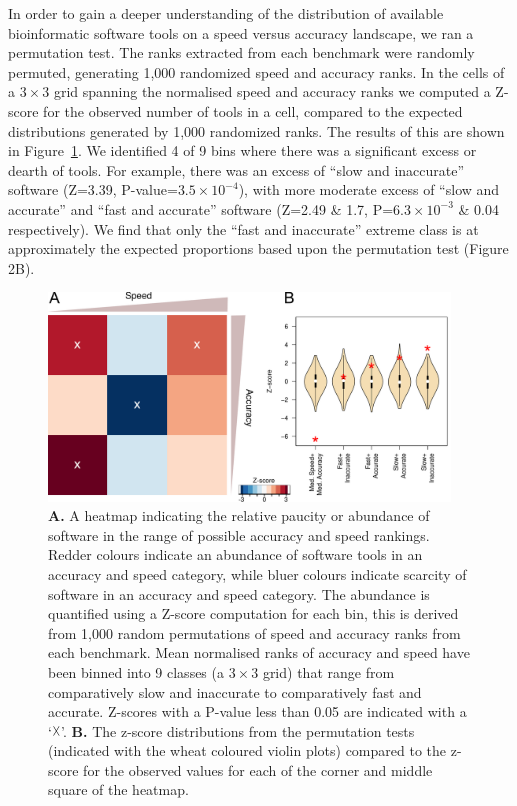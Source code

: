 \documentclass{bmcart}
\begin{document}
In order to gain a deeper understanding of the distribution of
available bioinformatic software tools on a speed versus accuracy
landscape, we ran a permutation test. The ranks extracted
from each benchmark were randomly permuted, generating 1,000
randomized speed and accuracy ranks. In the cells of a $3\times3$
grid spanning the normalised speed and accuracy ranks we computed a
Z-score for the observed number of tools in a cell, compared to the
expected distributions generated by 1,000 randomized ranks. The results
of this are shown in Figure~\ref{fig:speedaccuracy}. We identified {\color{black}4}
of 9 bins where there was a significant excess or dearth of tools. For
example, there was an excess of ``slow and inaccurate'' software ({\color{black}Z=3.39,
P-value=$3.5\times 10^{-4}$}), with more moderate excess of ``slow and accurate'' and ``fast and accurate'' software (Z=2.49 \& 1.7, P=$6.3\times 10^{-3}$ \& 0.04 respectively). We find that only the ``fast and inaccurate'' extreme class is at approximately the
expected proportions based upon the permutation test (Figure 2B).


\begin{figure}[htb!]
\centering
\includegraphics[width=0.95\textwidth]{figure2.pdf}
\caption{\textbf{A.} A heatmap indicating the relative paucity or abundance of
  software in the range of possible accuracy and speed rankings. Redder
  colours indicate an abundance of software tools in an accuracy and
  speed category, while bluer colours indicate scarcity of software in
  an accuracy and speed category. The abundance is quantified using a
  Z-score computation for each bin, this is derived from 1,000 random
  permutations of speed and accuracy ranks from each
  benchmark. Mean normalised ranks of accuracy and speed have been
  binned into 9 classes (a $3\times 3$ grid) that range from
  comparatively slow and inaccurate to comparatively
  fast and accurate. Z-scores with a P-value less than 0.05 are indicated
  with a ‘$\vartimes$’. \textbf{B.} The z-score distributions from the permutation tests (indicated with the wheat coloured violin plots) compared to 
  the z-score for the observed values for each of the corner and middle square of the heatmap.}
\label{fig:speedaccuracy}
\end{figure}
\end{document}
